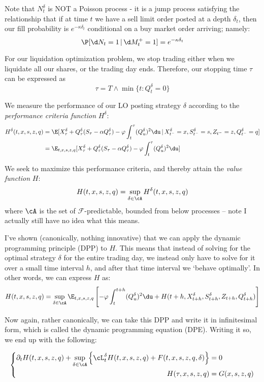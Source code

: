 \documentclass[12pt]{article}
\begin{document}
Note that $N^{\delta}_t$ is NOT a Poisson process - it is a jump process satisfying the relationship that if at time $t$ we have a sell limit order posted at a depth $\delta_t$, then our fill probability is $e^{-\kappa \delta_t}$ conditional on a buy market order arriving; namely:
\[ \P [\d N_t = 1 \, | \, \d M^+_t = 1] = e^{-\kappa \delta_t} \]

For our liquidation optimization problem, we stop trading either when we liquidate all our shares, or the trading day ends. Therefore, our stopping time $\tau$ can be expressed as 
\[ \tau = T \wedge \min \{ t: Q_t^\delta = 0 \} \]

We measure the performance of our LO posting strategy $\delta$ according to the \textit{performance criteria function} $H^\delta$:
\begin{align*}
H^\delta (t,x,s,z,q) & = \E [ X_\tau^\delta + Q_\tau^\delta(S_\tau - \alpha Q_\tau^\delta) - \varphi \int_t^\tau (Q_u^\delta)^2 \du \, | \, X_{t^-}^\delta = x, S_{t^-}^\delta = s, Z_{t^-} = z, Q_{t^-}^\delta = q] \\
& = \E_{t,x,s,z,q} [ X_\tau^\delta + Q_\tau^\delta(S_\tau - \alpha Q_\tau^\delta) - \varphi \int_t^\tau (Q_u^\delta)^2 \du ]
\end{align*} 

We seek to maximize this performance criteria, and thereby attain the \textit{value function} $H$:
\[ H(t,x,s,z,q) = \sup_{\delta \in \cA} H^\delta (t,x,s,z,q) \]
where $\cA$ is the set of $\mathcal{F}$-predictable, bounded from below processes -- note I actually still have no idea what this means.

I've shown (canonically, nothing innovative) that we can apply the dynamic programming principle (DPP) to $H$. This means that instead of solving for the optimal strategy $\delta$ for the entire trading day, we instead only have to solve for it over a small time interval $h$, and after that time interval we `behave optimally'. In other words, we can express $H$ as:
\[ H(t,x,s,z,q) = \sup_{\delta \in \cA} \E_{t,x,s,z,q} \left[ -\varphi \int_t^{t+h} (Q_u^\delta)^2 \du + H(t+h, X_{t+h}^\delta, S_{t+h}^\delta, Z_{t+h}, Q_{t+h}^\delta) \right] \]

Now again, rather canonically, we can take this DPP and write it in infinitesimal form, which is called the dynamic programming equation (DPE). Writing it so, we end up with the following:

\begin{equation}\label{eq:dpe}
\begin{split}
\left\lbrace \begin{aligned}
\partial_t H (t,x,s,z,q) + \sup\limits_{\delta \in \cA} \left\lbrace \cL^{\delta}_t H(t,x,s,z,q) + F(t,x,s,z,q,\delta) \right\rbrace & = 0 \\
H(\tau,x,s,z,q) & = G(x,s,z,q) 
\end{aligned} \right.
\end{split}
\end{equation}
\end{document}
